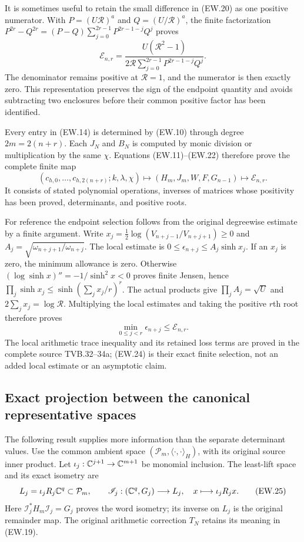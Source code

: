 It is sometimes useful to retain the small difference in (EW.20)
as one positive numerator. With
$P=(U\mathscr R)^a$ and $Q=(U/\mathscr R)^a$, the finite
factorization $P^{2r}-Q^{2r}=(P-Q)\sum_{j=0}^{2r-1}P^{2r-1-j}Q^j$
proves
\[
 \boxed{\mathcal E_{n,r}=
 \frac{U(\mathscr R^2-1)}
 {2\mathscr R\displaystyle\sum_{j=0}^{2r-1}P^{2r-1-j}Q^j}.}
                                                               \tag{EW.22}
\]
The denominator remains positive at $\mathscr R=1$, and the
numerator is then exactly zero. This representation preserves the
sign of the endpoint quantity and avoids subtracting two enclosures
before their common positive factor has been identified.

Every entry in (EW.14) is determined by (EW.10) through degree
$2m=2(n+r)$. Each $J_N$ and $B_N$ is computed by monic division
or multiplication by the same $\chi$. Equations (EW.11)--(EW.22)
therefore prove the complete finite map
\[
 \boxed{(c_{h,0},\ldots,c_{h,2(n+r)};k,\lambda,\chi)
    \longmapsto(H_m,J_m,W,F,G_{n-1})
    \longmapsto\mathcal E_{n,r}.}                            \tag{EW.23}
\]
It consists of stated polynomial operations, inverses of matrices
whose positivity has been proved, determinants, and positive roots.

For reference the endpoint selection follows from the original
degreewise estimate by a finite argument. Write
$x_j=\tfrac12\log(V_{n+j-1}/V_{n+j+1})\ge0$ and
$A_j=\sqrt{\omega_{n+j+1}/\omega_{n+j}}$.
The local estimate is $0\le\epsilon_{n+j}\le A_j\sinh x_j$.
If an $x_j$ is zero, the minimum allowance is zero. Otherwise
$(\log\sinh x)''=-1/\sinh^2x<0$ proves finite Jensen, hence
$\prod_j\sinh x_j\le\sinh(\sum_jx_j/r)^r$.
The actual products give
$\prod_jA_j=\sqrt U$ and $2\sum_jx_j=\log\mathscr R$.
Multiplying the local estimates and taking the positive $r$th root
therefore proves
\[
 \min_{0\le j<r}\epsilon_{n+j}\le\mathcal E_{n,r}.           \tag{EW.24}
\]
The local arithmetic trace inequality and its retained loss terms are
proved in the complete source TVB.32--34a; (EW.24) is their exact
finite selection, not an added local estimate or an asymptotic claim.

\subsection{Exact projection between the canonical representative spaces}

The following result supplies more information than the separate
determinant values. Use the common ambient space
$(\mathcal P_m,\langle\cdot,\cdot\rangle_H)$, with its original
source inner product. Let $\iota_j:\mathbb{C}^{j+1}\to\mathbb{C}^{m+1}$ be
monomial inclusion. The least-lift space and its exact isometry are
\[
 L_j=\iota_jR_j\mathbb{C}^q\subset\mathcal P_m,\qquad
 \mathscr I_j:(\mathbb{C}^q,G_j)\longrightarrow L_j,\quad x\longmapsto\iota_jR_jx.
                                                               \tag{EW.25}
\]
Here $\mathscr I_j^*H_m\mathscr I_j=G_j$ proves the word isometry;
its inverse on $L_j$ is the original remainder map. The original
arithmetic correction $T_N$ retains its meaning in (EW.19).

